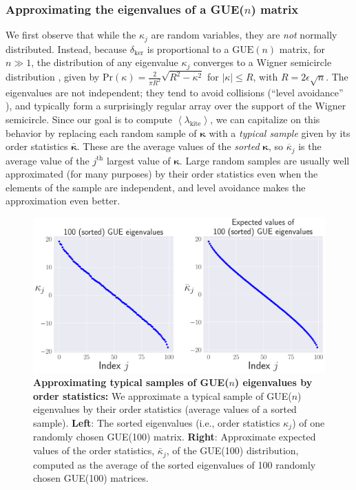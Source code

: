 \documentclass[aps,pra, twocolumn]{revtex4-1}
\newcommand{\expect}[1]{\ensuremath{\left\langle#1\right\rangle}}
\newcommand{\bvec}[1]{\boldsymbol{#1}}
\begin{document}
\subsubsection{Approximating the eigenvalues of a GUE($n$) matrix}
We first observe that while the $\kappa_j$ are random variables, they are \emph{not} normally distributed.  Instead, because $\delta_{\mathrm{ker}}$ is proportional to a $\mathrm{GUE}(n)$ matrix, for $n\gg1$, the distribution of any eigenvalue $\kappa_{j}$
converges to a Wigner semicircle distribution \cite{Wigner1958}, given by $\mathrm{Pr}(\kappa) = \frac{2}{\pi R^{2}}\sqrt{R^{2}-\kappa^{2}}$ for $|\kappa| \leq R$, with $R = 2\epsilon\sqrt{n}$.  The eigenvalues are not independent; they tend to avoid collisions (``level avoidance'' \cite{Tao2013}), 
and typically form a surprisingly regular array over the support of the Wigner semicircle.  Since our goal is to compute $\expect{\lambda_{\mathrm{kite}}}$, we can capitalize on this behavior by replacing each random sample of $\bvec{\kappa}$ with a 
\emph{typical sample} given by its order statistics $\bar{\bvec{\kappa}}$.  These are the average values of the \emph{sorted} 
$\bvec{\kappa}$, so $\overline{\kappa}_j$ is the average value of the $j^{\mathrm{th}}$ largest value of $\bvec{\kappa}$.  Large random samples 
are usually well approximated (for many purposes) by their order statistics even when the elements of the sample are 
independent, and level avoidance makes the approximation even better. 

\begin{figure}
\includegraphics[width=\columnwidth]{Images/Figure_7.pdf}
\caption{\textbf{Approximating typical samples of GUE($n$) eigenvalues by order statistics:} We approximate a typical sample of GUE($n$) eigenvalues by their order statistics (average values of a sorted sample).  \textbf{Left}:  The sorted eigenvalues (i.e., order statistics $\kappa_{j}$) of one randomly chosen GUE(100) matrix.  \textbf{Right}:  Approximate expected values of the order statistics, $\bar{\kappa}_{j}$, of the GUE(100) distribution, computed as the average of the sorted eigenvalues of 100 randomly chosen GUE(100) matrices.}
\label{fig:orderstatistics1}
\end{figure}
\end{document}
